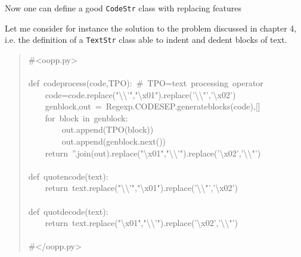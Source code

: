 \documentclass[10pt,english]{article}
\begin{document}
Now one can define a good \texttt{CodeStr} class with replacing features

Let me consider for instance the solution to the problem discussed in chapter
4, i.e. the definition of a \texttt{TextStr} class able to indent and dedent
blocks of text.
\begin{quote}
\begin{ttfamily}\begin{flushleft}
\mbox{{\#}<oopp.py>}\\
\mbox{}\\
\mbox{def~codeprocess(code,TPO):~{\#}~TPO=text~processing~operator}\\
\mbox{~~~~code=code.replace("{\textbackslash}{\textbackslash}'","{\textbackslash}x01").replace('{\textbackslash}{\textbackslash}"','{\textbackslash}x02')}\\
\mbox{~~~~genblock,out~=~Regexp.CODESEP.generateblocks(code),[]}\\
\mbox{~~~~for~block~in~genblock:}\\
\mbox{~~~~~~~~out.append(TPO(block))}\\
\mbox{~~~~~~~~out.append(genblock.next())}\\
\mbox{~~~~return~''.join(out).replace("{\textbackslash}x01","{\textbackslash}{\textbackslash}'").replace('{\textbackslash}x02','{\textbackslash}{\textbackslash}"')}\\
\mbox{}\\
\mbox{def~quotencode(text):}\\
\mbox{~~~~return~text.replace("{\textbackslash}{\textbackslash}'","{\textbackslash}x01").replace('{\textbackslash}{\textbackslash}"','{\textbackslash}x02')}\\
\mbox{}\\
\mbox{def~quotdecode(text):}\\
\mbox{~~~~return~text.replace("{\textbackslash}x01","{\textbackslash}{\textbackslash}'").replace('{\textbackslash}x02','{\textbackslash}{\textbackslash}"')}\\
\mbox{}\\
\mbox{{\#}</oopp.py>}
\end{flushleft}\end{ttfamily}
\end{quote}
\end{document}
